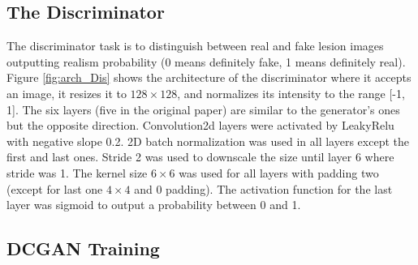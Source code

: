 \documentclass[final,3p,twocolumn,authoryear,sort&compress,times]{maia}
\begin{document}
\subsection{The Discriminator}
The discriminator task is to distinguish between real and fake lesion images outputting realism probability (0 means definitely fake, 1 means definitely real). Figure \ref{fig:arch_Dis} shows the architecture of the discriminator where it accepts an image, it resizes it to $128 \times 128$, and normalizes its intensity to the range [-1, 1]. The six layers (five in the original paper) are similar to the generator's ones but the opposite direction. Convolution2d layers were activated by LeakyRelu with negative slope 0.2. 2D batch normalization was used in all layers except the first and last ones. Stride 2 was used to downscale the size until layer 6 where stride was 1. The kernel size $6 \times 6$ was used for all layers with padding two (except for last one $4 \times 4$ and 0 padding). The activation function for the last layer was sigmoid to output a probability between 0 and 1.

\subsection{DCGAN Training}
\label{sec:gan_training}
\end{document}
